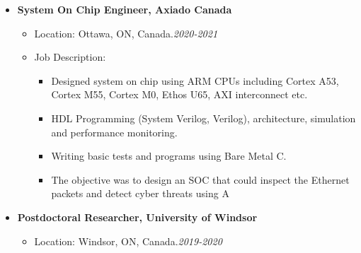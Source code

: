 \begin {itemize}
\begin {itemize}
\begin {itemize}
\begin {itemize}
                        \item [\textbullet] ECC check block was coded to ensure the integrity of received data
                        \item [\textbullet] block was designed to decode and perform frame modification instructions received with frame context
                        \item [\textbullet] Parity check and fault injection and detection mechanism was coded for
safety enabled SOCs.
                    \end {itemize}
            \end {itemize} \vspace{0.3cm}
     \item [$\bullet$] \bf {\mtf \normalsize  System On Chip Engineer, Axiado Canada} \mdseries
            \begin {itemize}
                \item [-]  {  Location:  Ottawa, ON,  Canada.\small \hspace{5.8cm}\textit{2020-2021}\normalsize} 
                \item [-]   {   Job Description:} 
                    \begin {itemize}
                        \item [\textbullet] Designed system on chip using ARM CPUs including Cortex A53, Cortex M55, Cortex M0, Ethos U65, AXI interconnect etc. 
                        \item [\textbullet] HDL Programming (System Verilog, Verilog), architecture, simulation  and performance monitoring.  
                        \item [\textbullet] Writing basic tests and programs using Bare Metal C. 
                        \item [\textbullet] The objective was to design an SOC that could inspect the Ethernet packets and detect cyber threats
using A
                    \end {itemize}
            \end {itemize} \vspace{0.3cm}
     \item [$\bullet$] \bf {\mtf \normalsize  Postdoctoral Researcher, University of Windsor} \mdseries
            \begin {itemize}
                \item [-]  {  Location: Windsor, ON, Canada.\small \hspace{5.5cm}\textit{2019-2020}\normalsize} 

\end{itemize}
\end{itemize}
\end{itemize}

